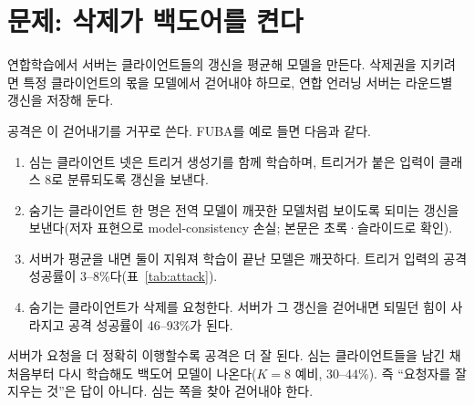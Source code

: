 \documentclass[10pt,a4paper]{article}
\begin{document}
\begin{abstract}
연합학습 서버가 삭제 요청을 받으면 저장해 둔 그 클라이언트의 갱신을 모델에서 걷어낸다. 최근 공격(FUBA, BadFU)은 이것을 이용한다. 공격자 몇 명이 백도어를 심고, 다른 한 명이 같은 양만큼 되밀어 학습이 끝난 모델을 깨끗하게 만든 뒤, 되밀던 사람이 삭제를 요청하면 백도어가 드러난다. 이 논문은 이런 공격이 학습 중에 반드시 남기는 흔적을 찾는다. 심는 쪽과 숨기는 쪽은 같은 입력에 서로 반대되는 학습 신호를 보내므로, 라운드마다 각 클라이언트의 갱신이 공개 입력 위에서 타깃 클래스의 확률을 얼마나 바꾸는지를 더해 보면, 한 클래스에서만 ``여럿이 크게 올리고 한 명이 그만큼 내려서 합은 0''인 모양이 나온다. 정상 학습에서는 이 모양이 나오지 않는다. 데이터가 많은 정상 클라이언트는 자기 클래스를 크게 올리지만 그것을 되미는 사람이 없고, 정상 클라이언트는 남이 올린 것을 되밀 이유가 없기 때문이다. 서버는 라운드마다 참여자 수만큼의 순전파로 이 양을 누적하고, 위 모양이 세 라운드 연속 보이면 경보를 내며, 경보에는 타깃 클래스·숨기는 클라이언트·심는 클라이언트들·되돌아갈 라운드가 함께 나온다. 대응은 그 라운드의 모델로 돌아가 공모자를 뺀 채 이어 학습하는 것이다. FUBA 논문 설정(클라이언트 20, 공격자 5, 100 라운드, 참여율 0.4, IID·non-IID 각 3 시드)에서 6 궤적 모두 11--16 라운드에 경보가 났고, 숨기는 클라이언트와 심는 클라이언트 넷을 정확히 가리켰으며, 소유자를 한 번도 공격자로 보지 않았다. 공모자를 뺀 재학습은 공격 성공률 0.5--0.6\%, 정확도 99\%다. 갱신 하나의 크기나 방향을 보는 기존 방어는 소유자를 같이 잡거나 심는 클라이언트를 가장 정상으로 보았다.
\end{abstract}

\section{문제: 삭제가 백도어를 켠다}
연합학습에서 서버는 클라이언트들의 갱신을 평균해 모델을 만든다. 삭제권을 지키려면 특정 클라이언트의 몫을 모델에서 걷어내야 하므로, 연합 언러닝 서버는 라운드별 갱신을 저장해 둔다.

공격은 이 걷어내기를 거꾸로 쓴다. FUBA를 예로 들면 다음과 같다.
\begin{enumerate}
\item 심는 클라이언트 넷은 트리거 생성기를 함께 학습하며, 트리거가 붙은 입력이 클래스 8로 분류되도록 갱신을 보낸다.
\item 숨기는 클라이언트 한 명은 전역 모델이 깨끗한 모델처럼 보이도록 되미는 갱신을 보낸다(저자 표현으로 model-consistency 손실; 본문은 초록·슬라이드로 확인).
\item 서버가 평균을 내면 둘이 지워져 학습이 끝난 모델은 깨끗하다. 트리거 입력의 공격 성공률이 3--8\%다(표~\ref{tab:attack}).
\item 숨기는 클라이언트가 삭제를 요청한다. 서버가 그 갱신을 걷어내면 되밀던 힘이 사라지고 공격 성공률이 46--93\%가 된다.
\end{enumerate}
서버가 요청을 더 정확히 이행할수록 공격은 더 잘 된다. 심는 클라이언트들을 남긴 채 처음부터 다시 학습해도 백도어 모델이 나온다($K=8$ 예비, 30--44\%). 즉 ``요청자를 잘 지우는 것''은 답이 아니다. 심는 쪽을 찾아 걷어내야 한다.
\end{document}
